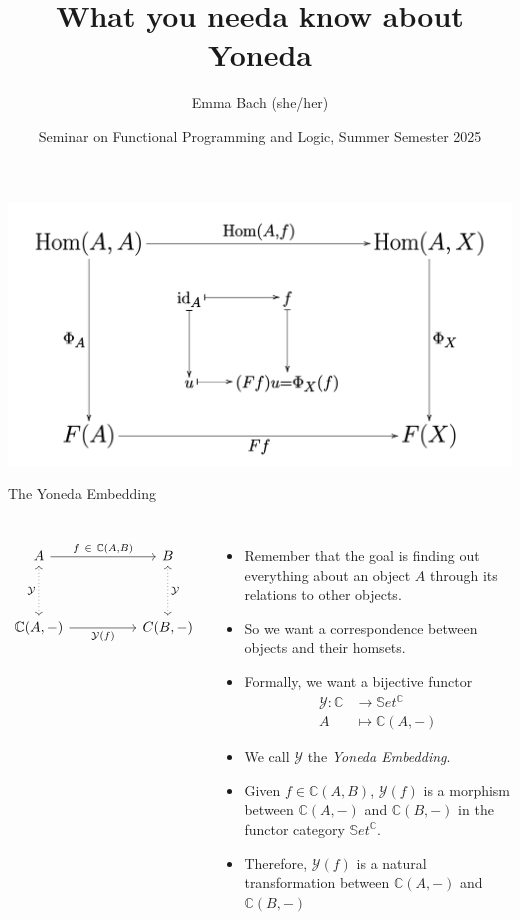 \documentclass[aspectratio=169]{beamer} %
\title{What you needa know about Yoneda}
\author{Emma Bach (she/her)}
\date{Seminar on Functional Programming and Logic, Summer Semester 2025}
\newcommand{\bC}{\mathbb{C}}
\newcommand{\bS}{\mathbb{S}}
\newcommand{\mY}{\mathcal{Y}}
\begin{document}

\begin{frame}[plain]
    \includegraphics[width=0.4\paperwidth]{figures/Yoneda_lemma_cd.svg.png}
    \titlepage
\end{frame}

%
%

\begin{frame}[fragile]{The Yoneda Embedding}
\begin{columns}
\[\begin{tikzcd}
	A && B \\
	\\
	{\mathbb{C}(A, -)} && {C(B,-)}
	\arrow["{f\ \in\ \mathbb{C}(A,B)}", from=1-1, to=1-3]
	\arrow["{\mathcal{Y}}"', dotted, leftrightarrow, from=1-1, to=3-1]
	\arrow["{\mathcal{Y}}", dotted, leftrightarrow, from=1-3, to=3-3]
	\arrow["{\mathcal{Y}(f)}"', from=3-1, to=3-3]
\end{tikzcd}\]
 \begin{itemize}
    \item Remember that the goal is finding out everything about an object $A$ through its relations to other objects.
    \pause\item So we want a correspondence between objects and their homsets.
    \pause\item Formally, we want a bijective functor
    \begin{align*}
     \mY : \bC &\to \bS et^\bC\\
           A &\mapsto \bC(A,-)
    \end{align*}
    \vspace{-16pt}\pause\item We call $\mY$ the \textit{Yoneda Embedding}.
    \pause\item Given $f \in \bC(A,B)$, $\mY(f)$ is a morphism between $\bC(A, -)$ and $\bC(B, -)$ in the functor category $\bS et^{\bC}$.
    \pause\item Therefore, $\mY(f)$ is a natural transformation between $\bC(A, -)$ and $\bC(B, -)$
 \end{itemize}
\end{columns}
\end{frame}
\end{document}
